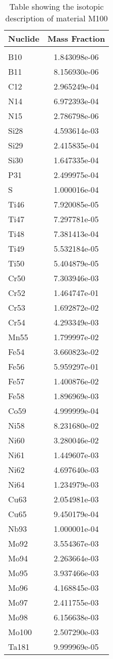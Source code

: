 \begin{centering}
\begin{table}[ht!]
\begin{tabular}{l | c}
\hline
Nuclide & Mass Fraction\\
\hline
\\
B10 & 1.843098e-06\\
B11 & 8.156930e-06\\
C12 & 2.965249e-04\\
N14 & 6.972393e-04\\
N15 & 2.786798e-06\\
Si28 & 4.593614e-03\\
Si29 & 2.415835e-04\\
Si30 & 1.647335e-04\\
P31 & 2.499975e-04\\
S & 1.000016e-04\\
Ti46 & 7.920085e-05\\
Ti47 & 7.297781e-05\\
Ti48 & 7.381413e-04\\
Ti49 & 5.532184e-05\\
Ti50 & 5.404879e-05\\
Cr50 & 7.303946e-03\\
Cr52 & 1.464747e-01\\
Cr53 & 1.692872e-02\\
Cr54 & 4.293349e-03\\
Mn55 & 1.799997e-02\\
Fe54 & 3.660823e-02\\
Fe56 & 5.959297e-01\\
Fe57 & 1.400876e-02\\
Fe58 & 1.896969e-03\\
Co59 & 4.999999e-04\\
Ni58 & 8.231680e-02\\
Ni60 & 3.280046e-02\\
Ni61 & 1.449607e-03\\
Ni62 & 4.697640e-03\\
Ni64 & 1.234979e-03\\
Cu63 & 2.054981e-03\\
Cu65 & 9.450179e-04\\
Nb93 & 1.000001e-04\\
Mo92 & 3.554367e-03\\
Mo94 & 2.263664e-03\\
Mo95 & 3.937466e-03\\
Mo96 & 4.168845e-03\\
Mo97 & 2.411755e-03\\
Mo98 & 6.156638e-03\\
Mo100 & 2.507290e-03\\
Ta181 & 9.999969e-05
\end{tabular}
\caption{Table showing the isotopic description of material M100}
\label{table:material_M100}
\end{table}\clearpage


\end{centering}
